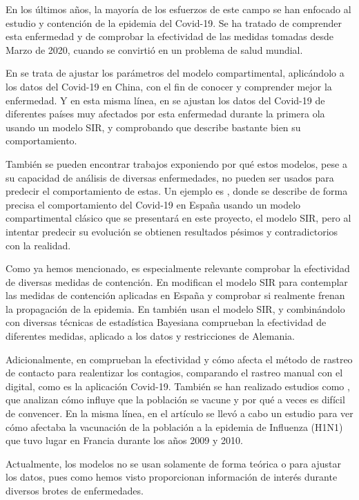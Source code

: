 En los últimos años, la mayoría de los esfuerzos de este campo se han enfocado al estudio y contención de la epidemia del Covid-19. Se ha tratado de comprender esta enfermedad y de comprobar la efectividad de las medidas tomadas desde Marzo de 2020, cuando se convirtió en un problema de salud mundial.

En \cite{demongeotSIEpidemicModel} se trata de ajustar los parámetros del modelo compartimental, aplicándolo a los datos del Covid-19 en China, con el fin de conocer y comprender mejor la enfermedad. Y en esta misma línea, en \cite{enrique_amaro} se ajustan los datos del Covid-19 de diferentes países muy afectados por esta enfermedad durante la primera ola usando un modelo SIR, y comprobando que describe bastante bien su comportamiento.

También se pueden encontrar trabajos exponiendo por qué estos modelos, pese a su capacidad de análisis de diversas enfermedades, no pueden ser usados para predecir el comportamiento de estas. Un ejemplo es \cite{turningpoint}, donde se describe de forma precisa el comportamiento del Covid-19 en España usando un modelo compartimental clásico que se presentará en este proyecto, el modelo SIR, pero al intentar predecir su evolución se obtienen resultados pésimos y contradictorios con la realidad.

Como ya hemos mencionado, es especialmente relevante comprobar la efectividad de diversas medidas de contención. En \cite{gutierrez2020analisis} modifican el modelo SIR para contemplar las medidas de contención aplicadas en España y comprobar si realmente frenan la propagación de la epidemia. En \cite{inferringinterventions} también usan el modelo SIR, y combinándolo con diversas técnicas de estadística Bayesiana comprueban la efectividad de diferentes medidas, aplicado a los datos y restricciones de Alemania.

Adicionalmente, en \cite{Mancastroppa2021} comprueban la efectividad y cómo afecta el método de rastreo de contacto para realentizar los contagios, comparando el rastreo manual con el digital, como es la aplicación Covid-19. También se han realizado estudios como \cite{vaccinationproblem}, que analizan cómo influye que la población se vacune y por qué a veces es difícil de convencer. En la misma línea, en el artículo \cite{Laguzet2015} se llevó a cabo un estudio para ver cómo afectaba la vacunación de la población a la epidemia de Influenza (H1N1) que tuvo lugar en Francia durante los años 2009 y 2010.

Actualmente, los modelos no se usan solamente de forma teórica o para ajustar los datos, pues como hemos visto proporcionan información de interés durante diversos brotes de enfermedades.


